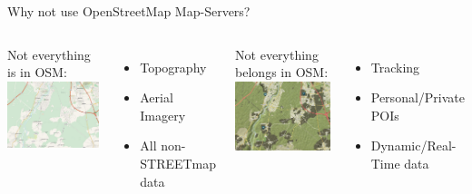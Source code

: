 \documentclass{beamer}
\begin{document}
\begin{frame}{Why not use OpenStreetMap Map-Servers?}
 \vspace{0.8em}
 \begin{columns}
   {\small Not everything is in OSM:\vspace{1em}}
   \includegraphics[scale=0.169]{images/map_render_osm}
   \begin{itemize}
    \item Topography
    \item Aerial Imagery
    \item All non-STREETmap data
   \end{itemize}
   {\small Not everything belongs in OSM:\vspace{1em}}
   \includegraphics[scale=0.169]{images/map_render_dspace}
   \begin{itemize}
    \item Tracking
    \item Personal/Private POIs
    \item Dynamic/Real-Time data
   \end{itemize}
 \end{columns}
\end{frame}
\end{document}

